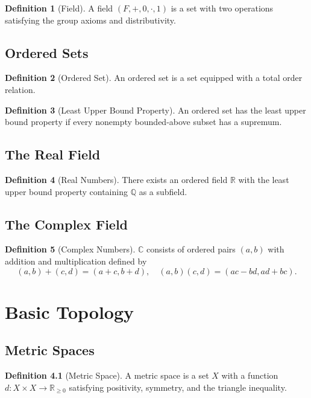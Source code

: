 \documentclass[11pt]{book}
\theoremstyle{definition}
\newtheorem{definition}{Definition}[chapter]
\theoremstyle{plain}
\newcommand{\R}{\mathbb{R}}
\newcommand{\C}{\mathbb{C}}
\newcommand{\Q}{\mathbb{Q}}
\begin{document}
\begin{definition}[Field]
A field $(F,+,0,\cdot,1)$ is a set with two operations satisfying the group axioms and distributivity.
\end{definition}

\section{Ordered Sets}

\begin{definition}[Ordered Set]
An ordered set is a set equipped with a total order relation.
\end{definition}

\begin{definition}[Least Upper Bound Property]
An ordered set has the least upper bound property if every nonempty bounded-above subset
has a supremum.
\end{definition}

\section{The Real Field}

\begin{definition}[Real Numbers]
There exists an ordered field $\R$ with the least upper bound property containing $\Q$ as a subfield.
\end{definition}

\section{The Complex Field}

\begin{definition}[Complex Numbers]
$\C$ consists of ordered pairs $(a,b)$ with addition and multiplication defined by
\[
(a,b)+(c,d)=(a+c,b+d), \quad (a,b)(c,d)=(ac-bd,ad+bc).
\]
\end{definition}

\chapter{Basic Topology}

\section{Metric Spaces}

\begin{definition}[Metric Space]
A metric space is a set $X$ with a function $d:X\times X\to \R_{\ge 0}$ satisfying positivity,
symmetry, and the triangle inequality.
\end{definition}
\end{document}
